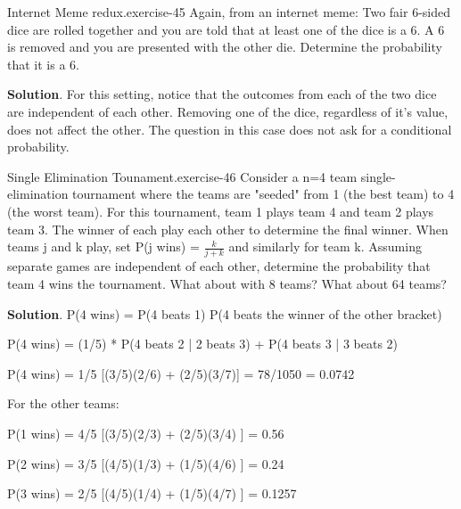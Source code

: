 \documentclass[10pt,]{book}
\numberwithin{equation}{section}
\begin{document}
%
\par
\hypertarget{p-643}{}%
\begin{inlineexercise}{Internet Meme redux.}{exercise-45}%
\hypertarget{p-644}{}%
Again, from an internet meme:  Two fair 6-sided dice are rolled together and you are told that at least one of the dice is a 6. A 6 is removed and you are presented with the other die.  Determine the probability that it is a 6.%
\par\smallskip%
\noindent\textbf{Solution}.\hypertarget{solution-21}{}\quad%
\hypertarget{p-645}{}%
For this setting, notice that the outcomes from each of the two dice are independent of each other. Removing one of the dice, regardless of it's value, does not affect the other. The question in this case does not ask for a conditional probability.%
\end{inlineexercise}
%
\par
\hypertarget{p-646}{}%
\begin{inlineexercise}{Single Elimination Tounament.}{exercise-46}%
\hypertarget{p-647}{}%
Consider a n=4 team single-elimination tournament where the teams are "seeded" from 1 (the best team) to 4 (the worst team).  For this tournament, team 1 plays team 4 and team 2 plays team 3. The winner of each play each other to determine the final winner. When teams j and k play, set P(j wins) = \(\frac{k}{j+k}\) and similarly for team k.  Assuming separate games are independent of each other, determine the probability that team 4 wins the tournament. What about with 8 teams? What about 64 teams?%
\par\smallskip%
\noindent\textbf{Solution}.\hypertarget{solution-22}{}\quad%
\hypertarget{p-648}{}%
P(4 wins) = P(4 beats 1) P(4 beats the winner of the other bracket)%
\par
\hypertarget{p-649}{}%
P(4 wins) = (1/5) * P(4 beats 2 | 2 beats 3) + P(4 beats 3 | 3 beats 2)%
\par
\hypertarget{p-650}{}%
P(4 wins) = 1/5 [(3/5)(2/6) + (2/5)(3/7)] = 78/1050 = 0.0742%
\par
\hypertarget{p-651}{}%
For the other teams:%
\par
\hypertarget{p-652}{}%
P(1 wins) = 4/5 [(3/5)(2/3) + (2/5)(3/4) ] = 0.56%
\par
\hypertarget{p-653}{}%
P(2 wins) = 3/5 [(4/5)(1/3) + (1/5)(4/6) ] = 0.24%
\par
\hypertarget{p-654}{}%
P(3 wins) = 2/5 [(4/5)(1/4) + (1/5)(4/7) ] = 0.1257%
\end{inlineexercise}
%
%
%
\typeout{************************************************}
\typeout{************************************************}
%
\end{document}
